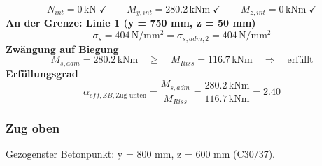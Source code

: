 \documentclass[11pt,a4paper]{article}
\begin{document}
\begin{equation*}
N_{int} = 0\,\mathrm{kN} \;\checkmark \qquad M_{y,int} = 280.2\,\mathrm{kNm} \;\checkmark \qquad M_{z,int} = 0\,\mathrm{kNm} \;\checkmark
\end{equation*}
\noindent\textbf{An der Grenze: Linie 1 (y = 750 mm, z = 50 mm)}
\begin{equation*}
\sigma_s = 404\,\mathrm{N}/\mathrm{mm}^{2} = \sigma_{s,adm,2} = 404\,\mathrm{N}/\mathrm{mm}^{2}
\end{equation*}
\noindent\textbf{Zwängung auf Biegung}
\begin{equation*}
M_{s,adm} = 280.2\,\mathrm{kNm} \quad \ge \quad M_{Riss} = 116.7\,\mathrm{kNm} \quad \Rightarrow \quad \text{erfüllt}
\end{equation*}
\noindent\textbf{Erfüllungsgrad}
\begin{equation*}
\alpha_{eff,ZB,\text{Zug unten}} = \frac{M_{s,adm}}{M_{Riss}} = \frac{280.2\,\mathrm{kNm}}{116.7\,\mathrm{kNm}} = 2.40
\end{equation*}
\subsubsection{Zug oben}
Gezogenster Betonpunkt: y = 800 mm, z = 600 mm (C30/37).
\end{document}
